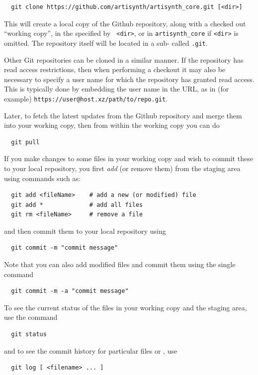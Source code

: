\begin{verbatim}
  git clone https://github.com/artisynth/artisynth_core.git [<dir>]
\end{verbatim}

This will create a local copy of the Github repository, along with a
checked out ``working copy'', in the \directory{} specified by {\tt
<dir>}, or in {\tt artisynth\_core} if {\tt <dir>} is
omitted.  The repository itself will be located in a sub-\directory{}
called {\tt .git}.

Other Git repositories can be cloned in a similar manner.  If the
repository has read access restrictions, then when performing a checkout it
may also be necessary to specify a user name for which the repository
has granted read access. This is typically done by embedding the user
name in the URL, as in (for example)
{\tt https://user@host.xz/path/to/repo.git}.

Later, to fetch the latest updates from the Github repository and
merge them into your working copy, then from within the working copy
\directory{} you can do
\begin{verbatim}
  git pull
\end{verbatim}

If you make changes to some files in your working copy and wish to
commit these to your local repository, you first {\it add} (or remove
them) from the staging area using commands such as:
\begin{verbatim}
  git add <fileName>    # add a new (or modified) file
  git add *             # add all files
  git rm <fileName>     # remove a file
\end{verbatim}
and then commit them to your local repository using
\begin{verbatim}
  git commit -m "commit message"
\end{verbatim}
Note that you can also add modified files and commit them using the single
command
\begin{verbatim}
  git commit -m -a "commit message"
\end{verbatim}

To see the current status of the files in your working copy
and the staging area, use the command
\begin{verbatim}
  git status
\end{verbatim}
and to see the commit history for particular files or \directories{},
use 
\begin{verbatim}
  git log [ <filename> ... ]
\end{verbatim}

